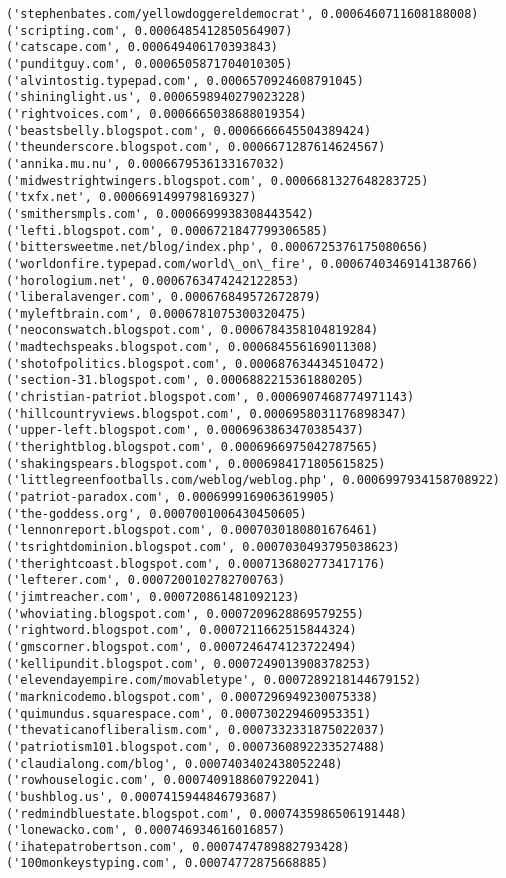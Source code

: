 \documentclass[11pt]{article}
\begin{document}
\begin{Verbatim}[commandchars=\\\{\}]
('stephenbates.com/yellowdoggereldemocrat', 0.0006460711608188008)
('scripting.com', 0.0006485412850564907)
('catscape.com', 0.000649406170393843)
('punditguy.com', 0.0006505871704010305)
('alvintostig.typepad.com', 0.0006570924608791045)
('shininglight.us', 0.0006598940279023228)
('rightvoices.com', 0.0006665038688019354)
('beastsbelly.blogspot.com', 0.0006666645504389424)
('theunderscore.blogspot.com', 0.0006671287614624567)
('annika.mu.nu', 0.0006679536133167032)
('midwestrightwingers.blogspot.com', 0.0006681327648283725)
('txfx.net', 0.0006691499798169327)
('smithersmpls.com', 0.0006699938308443542)
('lefti.blogspot.com', 0.0006721847799306585)
('bittersweetme.net/blog/index.php', 0.0006725376175080656)
('worldonfire.typepad.com/world\_on\_fire', 0.0006740346914138766)
('horologium.net', 0.0006763474242122853)
('liberalavenger.com', 0.000676849572672879)
('myleftbrain.com', 0.0006781075300320475)
('neoconswatch.blogspot.com', 0.0006784358104819284)
('madtechspeaks.blogspot.com', 0.000684556169011308)
('shotofpolitics.blogspot.com', 0.000687634434510472)
('section-31.blogspot.com', 0.0006882215361880205)
('christian-patriot.blogspot.com', 0.0006907468774971143)
('hillcountryviews.blogspot.com', 0.0006958031176898347)
('upper-left.blogspot.com', 0.0006963863470385437)
('therightblog.blogspot.com', 0.0006966975042787565)
('shakingspears.blogspot.com', 0.0006984171805615825)
('littlegreenfootballs.com/weblog/weblog.php', 0.0006997934158708922)
('patriot-paradox.com', 0.0006999169063619905)
('the-goddess.org', 0.0007001006430450605)
('lennonreport.blogspot.com', 0.0007030180801676461)
('tsrightdominion.blogspot.com', 0.0007030493795038623)
('therightcoast.blogspot.com', 0.0007136802773417176)
('lefterer.com', 0.0007200102782700763)
('jimtreacher.com', 0.000720861481092123)
('whoviating.blogspot.com', 0.0007209628869579255)
('rightword.blogspot.com', 0.0007211662515844324)
('gmscorner.blogspot.com', 0.0007246474123722494)
('kellipundit.blogspot.com', 0.0007249013908378253)
('elevendayempire.com/movabletype', 0.0007289218144679152)
('marknicodemo.blogspot.com', 0.0007296949230075338)
('quimundus.squarespace.com', 0.000730229460953351)
('thevaticanofliberalism.com', 0.0007332331875022037)
('patriotism101.blogspot.com', 0.0007360892233527488)
('claudialong.com/blog', 0.0007403402438052248)
('rowhouselogic.com', 0.0007409188607922041)
('bushblog.us', 0.0007415944846793687)
('redmindbluestate.blogspot.com', 0.0007435986506191448)
('lonewacko.com', 0.000746934616016857)
('ihatepatrobertson.com', 0.0007474789882793428)
('100monkeystyping.com', 0.00074772875668885)

\end{Verbatim}
\end{document}
